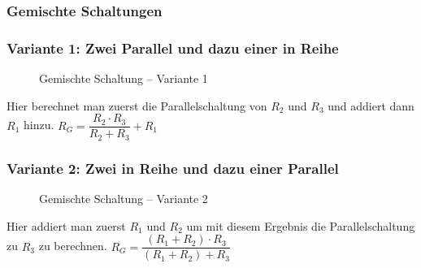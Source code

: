 \begin{frame}
\frametitle{Gemischte Schaltungen}
\end{frame}

\begin{frame}
\frametitle{Variante 1: Zwei Parallel und dazu einer in Reihe}

\begin{figure}
    \caption{\scriptsize Gemischte Schaltung -- Variante 1}
    \label{e_gemischte_schaltung_1}
\end{figure}
    \pause
    Hier berechnet man zuerst die Parallelschaltung von $R_2$ und $R_3$ und addiert dann $R_1$ hinzu.
    \pause
    $R_{ G } = \dfrac{ R_{ 2 } \cdot R_{ 3 } }{ R_{ 2 } + R_{ 3 }} + R_{ 1 }$



\end{frame}

\begin{frame}
\frametitle{Variante 2: Zwei in Reihe und dazu einer Parallel}

\begin{figure}
    \caption{\scriptsize Gemischte Schaltung -- Variante 2}
    \label{e_gemischte_schaltung_2}
\end{figure}
    \pause
    Hier addiert man zuerst $R_1$ und $R_2$ um mit diesem Ergebnis die Parallelschaltung zu $R_3$ zu berechnen.
    \pause
    $R_{ G } = \dfrac{ (R_{ 1 } + R_{ 2 }) \cdot R_{ 3 }} {( R_{ 1 } + R_{ 2 }) + R_{ 3 }}$



\end{frame}

\begin{frame}
\end{frame}

